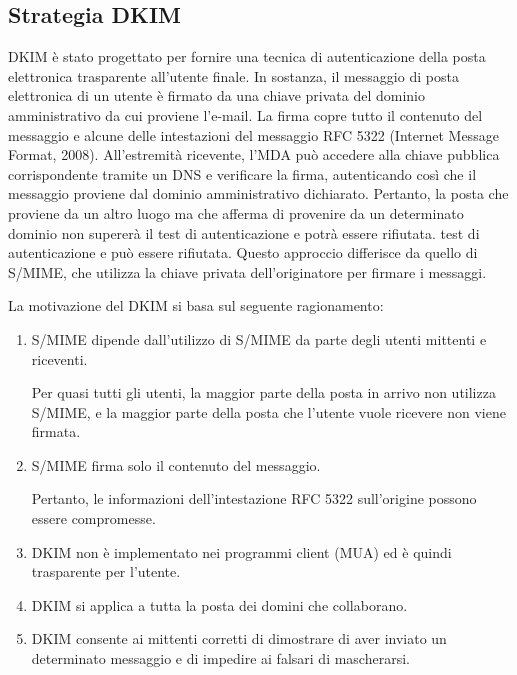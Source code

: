 \subsection{Strategia DKIM}
DKIM è stato progettato per fornire una tecnica di autenticazione della posta elettronica trasparente all'utente finale. In sostanza, il messaggio di posta elettronica di un utente è firmato da una chiave privata del dominio amministrativo da cui proviene l'e-mail. La firma copre tutto il contenuto del messaggio e alcune delle intestazioni del messaggio RFC 5322 (Internet Message Format, 2008). All'estremità ricevente, l'MDA può accedere alla chiave pubblica corrispondente tramite un DNS e verificare la firma, autenticando così che il messaggio proviene dal dominio amministrativo dichiarato. Pertanto, la posta che proviene da un altro luogo ma che afferma di provenire da un determinato dominio non supererà il test di autenticazione e potrà essere rifiutata. test di autenticazione e può essere rifiutata. Questo approccio differisce da quello di S/MIME, che utilizza la chiave privata dell'originatore per firmare i messaggi.

\singlespacing

La motivazione del DKIM si basa sul seguente ragionamento:

\begin{enumerate}
    \item  S/MIME dipende dall'utilizzo di S/MIME da parte degli utenti mittenti e riceventi.
    
    Per quasi tutti gli utenti, la maggior parte della posta in arrivo non utilizza S/MIME, e la maggior parte della posta che l'utente vuole ricevere non viene firmata.
    
    \item S/MIME firma solo il contenuto del messaggio. 
    
    Pertanto, le informazioni dell'intestazione RFC 5322 sull'origine possono essere compromesse.
    
    \item DKIM non è implementato nei programmi client (MUA) ed è quindi trasparente per l'utente.
    
    \item DKIM si applica a tutta la posta dei domini che collaborano.
    
    \item DKIM consente ai mittenti corretti di dimostrare di aver inviato un determinato messaggio e di impedire ai falsari di mascherarsi.
\end{enumerate}

